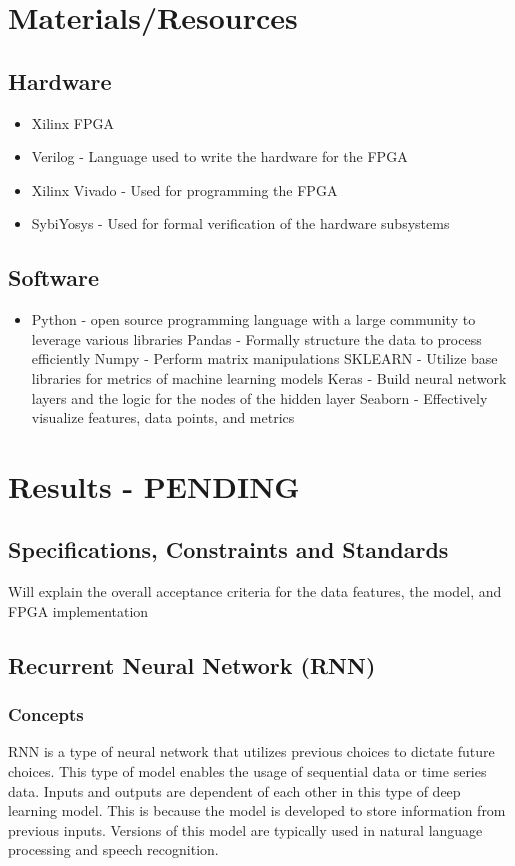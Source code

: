 \documentclass[12pt,titlepage]{article}
\begin{document}
\section{Materials/Resources}
\subsection{Hardware}
\begin{itemize}
	\item Xilinx FPGA
	\item Verilog - Language used to write the hardware for the FPGA
	\item Xilinx Vivado - Used for programming the FPGA
	\item SybiYosys - Used for formal verification of the hardware subsystems
\end{itemize}	

\subsection{Software}
\begin{itemize}
	\item Python - open source programming language with a large community to leverage various libraries
		\subitem Pandas - Formally structure the data to process efficiently
		\subitem Numpy - Perform matrix manipulations 
		\subitem SKLEARN - Utilize base libraries for metrics of machine learning models
		\subitem Keras - Build neural network layers and the logic for the nodes of the hidden layer
		\subitem Seaborn - Effectively visualize features, data points, and metrics
\end{itemize}	

\section{Results - PENDING}
\subsection{Specifications, Constraints and Standards}
Will explain the overall acceptance criteria for the data features, the model, and FPGA implementation

\subsection{Recurrent Neural Network (RNN)}
\subsubsection{Concepts}
RNN is a type of neural network that utilizes previous choices to dictate future choices. This type of model enables the usage of sequential data
or time series data. Inputs and outputs are dependent of each other in this type of deep learning model. This is because the model is developed
to store information from previous inputs. Versions of this model are typically used in natural language processing and speech recognition. 
\end{document}
